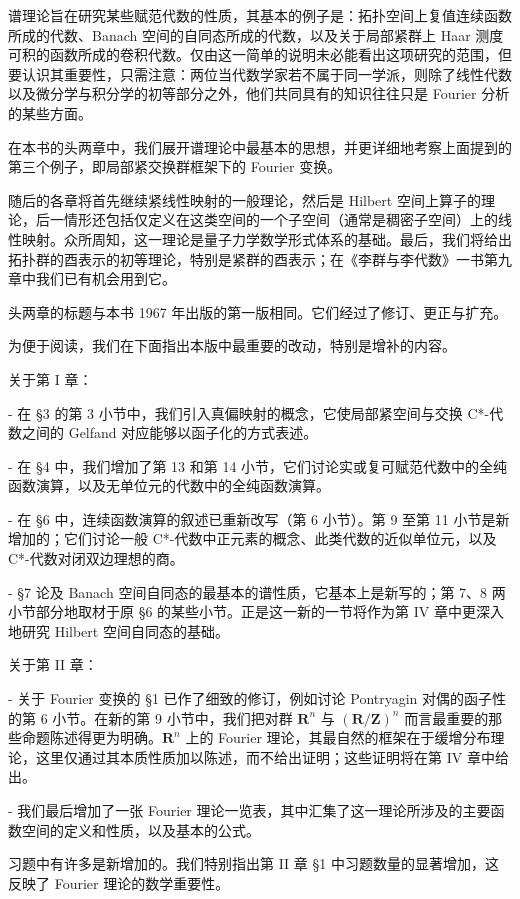 
谱理论旨在研究某些赋范代数的性质，其基本的例子是：拓扑空间上复值连续函数所成的代数、Banach 空间的自同态所成的代数，以及关于局部紧群上 Haar 测度可积的函数所成的卷积代数。仅由这一简单的说明未必能看出这项研究的范围，但要认识其重要性，只需注意：两位当代数学家若不属于同一学派，则除了线性代数以及微分学与积分学的初等部分之外，他们共同具有的知识往往只是 Fourier 分析的某些方面。

在本书的头两章中，我们展开谱理论中最基本的思想，并更详细地考察上面提到的第三个例子，即局部紧交换群框架下的 Fourier 变换。

随后的各章将首先继续紧线性映射的一般理论，然后是 Hilbert 空间上算子的理论，后一情形还包括仅定义在这类空间的一个子空间（通常是稠密子空间）上的线性映射。众所周知，这一理论是量子力学数学形式体系的基础。最后，我们将给出拓扑群的酉表示的初等理论，特别是紧群的酉表示；在《李群与李代数》一书第九章中我们已有机会用到它。

头两章的标题与本书 1967 年出版的第一版相同。它们经过了修订、更正与扩充。

为便于阅读，我们在下面指出本版中最重要的改动，特别是增补的内容。

关于第 I 章：

- 在 §3 的第 3 小节中，我们引入真偏映射的概念，它使局部紧空间与交换 C*-代数之间的 Gelfand 对应能够以函子化的方式表述。

- 在 §4 中，我们增加了第 13 和第 14 小节，它们讨论实或复可赋范代数中的全纯函数演算，以及无单位元的代数中的全纯函数演算。

- 在 §6 中，连续函数演算的叙述已重新改写（第 6 小节）。第 9 至第 11 小节是新增加的；它们讨论一般 C*-代数中正元素的概念、此类代数的近似单位元，以及 C*-代数对闭双边理想的商。

- §7 论及 Banach 空间自同态的最基本的谱性质，它基本上是新写的；第 7、8 两小节部分地取材于原 §6 的某些小节。正是这一新的一节将作为第 IV 章中更深入地研究 Hilbert 空间自同态的基础。

关于第 II 章：

- 关于 Fourier 变换的 §1 已作了细致的修订，例如讨论 Pontryagin 对偶的函子性的第 6 小节。在新的第 9 小节中，我们把对群 \(\mathbf{R}^n\) 与 \((\mathbf{R}/\mathbf{Z})^n\) 而言最重要的那些命题陈述得更为明确。\(\mathbf{R}^n\) 上的 Fourier 理论，其最自然的框架在于缓增分布理论，这里仅通过其本质性质加以陈述，而不给出证明；这些证明将在第 IV 章中给出。

- 我们最后增加了一张 Fourier 理论一览表，其中汇集了这一理论所涉及的主要函数空间的定义和性质，以及基本的公式。

习题中有许多是新增加的。我们特别指出第 II 章 §1 中习题数量的显著增加，这反映了 Fourier 理论的数学重要性。

